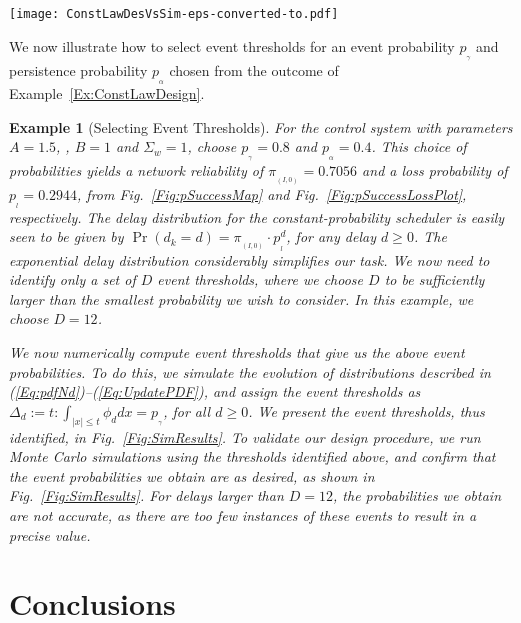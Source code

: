 \documentclass[twocolumn]{autart}
\newtheorem{example}{Example}[section]
\begin{document}
\begin{figure*}[ptb] \label{Fig:SimResults}
\centering
\texttt{[image: ConstLawDesVsSim-eps-converted-to.pdf]}
\caption[Constant Law Policy]{A comparison of analytical and simulated values of the event probability $p_{_{\gamma}}$, plotted against the axis on the left. The numerically computed values of the event thresholds $\Delta_d$ are plotted against the axis on the right. }
\end{figure*}

We now illustrate how to select event thresholds for an event probability $p_{_{\gamma}}$ and persistence probability $p_{_{\alpha}}$ chosen from the outcome of Example~\ref{Ex:ConstLawDesign}.
\begin{example}[Selecting Event Thresholds] \label{Ex:SelectLevels}
For the control system with parameters $A = 1.5$, , $B = 1$ and $\Sigma_w = 1$, choose $p_{_{\gamma}} = 0.8$ and $p_{_{\alpha}} = 0.4$. This choice of probabilities yields a network reliability of $\pi_{_{(I,0)}} = 0.7056$ and a loss probability of $p_{_{l}} = 0.2944$, from Fig.~\ref{Fig:pSuccessMap} and Fig.~\ref{Fig:pSuccessLossPlot}, respectively. The delay distribution for the constant-probability scheduler is easily seen to be given by $\Pr(d_k = d) = \pi_{_{(I,0)}} \cdot p_{_{l}}^d$, for any delay $d \ge 0$. The exponential delay distribution considerably simplifies our task. We now need to identify only a set of $D$ event thresholds, where we choose $D$ to be sufficiently larger than the smallest probability we wish to consider. In this example, we choose $D = 12$. 

We now numerically compute event thresholds that give us the above event probabilities. To do this, we simulate the evolution of distributions described in (\ref{Eq:pdfNd})--(\ref{Eq:UpdatePDF}), and assign the event thresholds as $\Delta_d := t: \int_{|x| \le t} \phi_d dx = p_{_{\gamma}}$, for all $d \ge 0$. We present the event thresholds, thus identified, in Fig.~\ref{Fig:SimResults}. To validate our design procedure, we run Monte Carlo simulations using the thresholds identified above, and confirm that the event probabilities we obtain are as desired, as shown in Fig.~\ref{Fig:SimResults}. For delays larger than $D = 12$, the probabilities we obtain are not accurate, as there are too few instances of these events to result in a precise value. \end{example}



\section{Conclusions} \label{S:Conclusions}
\end{document}
